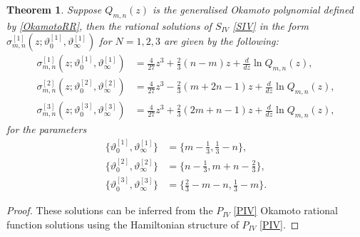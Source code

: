 \documentclass[12pt]{article}
\newtheorem{mydef}{Theorem}[section]
\numberwithin{figure}{section}
\numberwithin{equation}{section}
\numberwithin{table}{section}
\begin{document}
\begin{mydef}
Suppose $Q_{m,n}(z)$ is the generalised Okamoto polynomial defined by \eqref{OkamotoRR}, then the rational solutions of $S_{IV}$ \eqref{SIV} in the form $\sigma^{[1]}_{m,n}(z;\vartheta_0^{[1]},\vartheta_\infty^{[1]})$ for $N=1,2,3$ are given by the following:
\begin{subequations}
\begin{align}
\sigma^{[1]}_{m,n}(z;\vartheta_0^{[1]},\vartheta_\infty^{[1]})&=\tfrac{4}{27}z^3+\tfrac{2}{3}(n-m)z+\frac{d}{dz}\ln Q_{m,n}(z),\\
\sigma^{[2]}_{m,n}(z;\vartheta_0^{[2]},\vartheta_\infty^{[2]})&=\tfrac{4}{27}z^3-\tfrac{2}{3}(m+2n-1)z+\frac{d}{dz}\ln Q_{m,n}(z),\\
\sigma^{[3]}_{m,n}(z;\vartheta_0^{[3]},\vartheta_\infty^{[3]})&=\tfrac{4}{27}z^3+\tfrac{2}{3}(2m+n-1)z+\frac{d}{dz}\ln Q_{m,n}(z),
\end{align}
\end{subequations}
for the parameters
\begin{subequations}
\begin{align}
\{\vartheta_0^{[1]},\vartheta_\infty^{[1]}\}&=\{m-\tfrac{1}{3},\tfrac{1}{3}-n\},\\
\{\vartheta_0^{[2]},\vartheta_\infty^{[2]}\}&=\{n-\tfrac{1}{3},m+n-\tfrac{2}{3}\},\\
\{\vartheta_0^{[3]},\vartheta_\infty^{[3]}\}&=\{\tfrac{2}{3}-m-n,\tfrac{1}{3}-m\}.
\end{align}
\end{subequations}
\end{mydef}
\begin{proof}
These solutions can be inferred from the $P_{IV}$ \eqref{PIV} Okamoto rational function solutions using the Hamiltonian structure of $P_{IV}$ \eqref{PIV}.
\end{proof}
\end{document}
